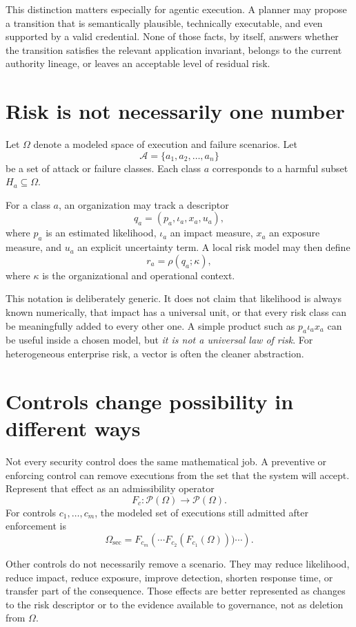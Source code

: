 \documentclass[10pt,oneside,openany]{book}
\begin{document}
This distinction matters especially for agentic execution. A planner may propose a transition that is semantically plausible, technically executable, and even supported by a valid credential. None of those facts, by itself, answers whether the transition satisfies the relevant application invariant, belongs to the current authority lineage, or leaves an acceptable level of residual risk.

\section{Risk is not necessarily one number}

Let $\Omega$ denote a modeled space of execution and failure scenarios. Let
\[
\mathcal{A}=\{a_1,a_2,\ldots,a_n\}
\]
be a set of attack or failure classes. Each class $a$ corresponds to a harmful subset $H_a\subseteq\Omega$.

For a class $a$, an organization may track a descriptor
\[
q_a=(p_a,\iota_a,x_a,u_a),
\]
where $p_a$ is an estimated likelihood, $\iota_a$ an impact measure, $x_a$ an exposure measure, and $u_a$ an explicit uncertainty term. A local risk model may then define
\[
r_a=\rho(q_a;\kappa),
\]
where $\kappa$ is the organizational and operational context.

This notation is deliberately generic. It does not claim that likelihood is always known numerically, that impact has a universal unit, or that every risk class can be meaningfully added to every other one. A simple product such as $p_a\iota_a x_a$ can be useful inside a chosen model, but \emph{it is not a universal law of risk}. For heterogeneous enterprise risk, a vector is often the cleaner abstraction.

\section{Controls change possibility in different ways}

Not every security control does the same mathematical job. A preventive or enforcing control can remove executions from the set that the system will accept. Represent that effect as an admissibility operator
\[
F_c:\mathcal{P}(\Omega)\rightarrow\mathcal{P}(\Omega).
\]
For controls $c_1,\ldots,c_m$, the modeled set of executions still admitted after enforcement is
\[
\Omega_{\mathrm{sec}}=F_{c_m}\!\left(\cdots F_{c_2}(F_{c_1}(\Omega)))\cdots\right).
\]

Other controls do not necessarily remove a scenario. They may reduce likelihood, reduce impact, reduce exposure, improve detection, shorten response time, or transfer part of the consequence. Those effects are better represented as changes to the risk descriptor or to the evidence available to governance, not as deletion from $\Omega$.
\end{document}
